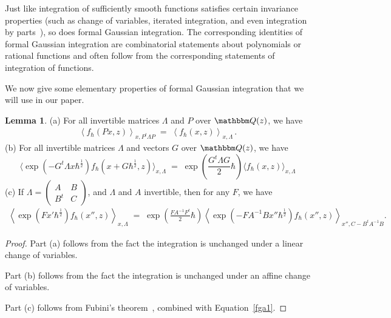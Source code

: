 \documentclass[12pt,reqno]{amsart}
\theoremstyle{definition}
\newtheorem{lemma}[theorem]{Lemma}
\def\BQ{\mathbbm Q}
\def\be{\begin{equation}}
\def\ee{\end{equation}}
\newcommand{\bea}{\begin{equation}\begin{aligned}}
\newcommand{\eea}{\end{aligned}\end{equation}}
\renewcommand{\=}{\;=\;}
\newcommand{\hroot}{\hbar^{\frac{1}{2}}}
\begin{document}
Just like integration of sufficiently smooth functions satisfies certain invariance
properties (such as change of variables, iterated integration, and even integration
by parts~\cite{AarhusII}), so does formal Gaussian integration. The corresponding
identities of formal Gaussian integration are combinatorial statements about
polynomials or rational functions and often follow from the corresponding statements
of integration of functions. 

We now give some elementary properties of formal Gaussian integration that we will
use in our paper.

\begin{lemma}
\label{lem.ff1}
\rm{(a)} For all invertible matrices $\Lambda$ and $P$ over $\BQ(z)$, we have
\bea
\left\langle
f_{\hbar}(Px,z)
\right\rangle_{x, P^t \Lambda P}
\= \left\langle f_{\hbar}(x,z)\right\rangle_{x,\Lambda}\,.
\eea
\rm{(b)} For all invertible matrices $\Lambda$ and vectors $G$ over $\BQ(z)$,
we have
\be
\label{fga1}
\langle\exp(-G^{t}\Lambda x \hroot) f_{\hbar}(x+G \hroot,z)
\rangle_{x,\Lambda} \= \exp\left(\frac{G^{t}\Lambda G}{2}\hbar\right)
\langle f_{\hbar}(x,z)\rangle_{x,\Lambda}
\ee
\rm{(c)} If
$\Lambda=\left(\begin{smallmatrix} A & B \\ B^t & C \end{smallmatrix}\right)$,
and $\Lambda$ and $A$ invertible, then for any $F$, we have 
\bea
\label{ff1}
\left\langle
\exp(F x' \hroot)f_{\hbar}(x'',z)
\right\rangle_{x,\Lambda}
\= \exp\left(\frac{FA^{-1}F^t}{2}\hbar \right)
\left\langle
\exp(-FA^{-1}B x''\hroot) f_{\hbar}(x'',z)
\right\rangle_{x'',C-B^t A^{-1} B} \!\!.
\eea
\end{lemma}

\begin{proof}
Part (a) follows from the fact the integration is unchanged
under a linear change of variables.

Part (b) follows from the fact the integration is unchanged
under an affine change of variables.

Part (c) follows from Fubini's theorem~\cite[Prop.2.13]{AarhusII}, combined
with Equation~\eqref{fga1}.
\end{proof}
\end{document}
